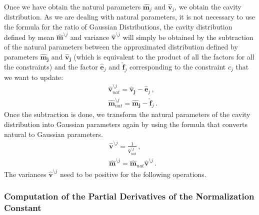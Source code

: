 Once we have obtain the natural parameters $\boldsymbol{\hat{m}}_{j}$ and $\boldsymbol{\hat{v}}_{j}$, we obtain the cavity distribution. As we are dealing with natural parameters, it is not necessary to use the formula for the ratio of Gaussian Distributions, the cavity distribution defined by mean $\boldsymbol{\hat{m}}^{\setminus j}$ and variance $\boldsymbol{\hat{v}}^{\setminus j}$ will simply be obtained by the subtraction of the natural parameters between the approximated distribution defined by parameters $\boldsymbol{\hat{m}_{j}}$ and $\boldsymbol{\hat{v}_{j}}$ (which is equivalent to the product of all the factors for all the constraints) and the factor $\boldsymbol{\hat{e}}_{j}$ and $\boldsymbol{\hat{f}}_{j}$ corresponding to the constraint $c_j$ that we want to update:
\begin{align}
& \boldsymbol{\hat{v}}_{nat}^{\setminus j} = \boldsymbol{\hat{v}_{j}} - \boldsymbol{\hat{e}}_{j}\,, \nonumber \\
& \boldsymbol{\hat{m}}_{nat}^{\setminus j} = \boldsymbol{\hat{m}_{j}} - \boldsymbol{\hat{f}}_{j}\,.
\end{align}
Once the subtraction is done, we transform the natural parameters of the cavity distribution into Gaussian parameters again by using the formula that converts natural to Gaussian parameters.
\begin{align}
& \boldsymbol{\hat{v}}^{\setminus j} = \frac{1}{\boldsymbol{\hat{v}}_{nat}^{\setminus j}}\,, \nonumber \\
& \boldsymbol{\hat{m}}^{\setminus j} = \boldsymbol{\hat{m}}_{nat} \boldsymbol{\hat{v}}^{\setminus j}\,.
\end{align}
The variances $\boldsymbol{\hat{v}}^{\setminus j}$ need to be positive for the following operations.

\subsubsection{Computation of the Partial Derivatives of the Normalization Constant}

